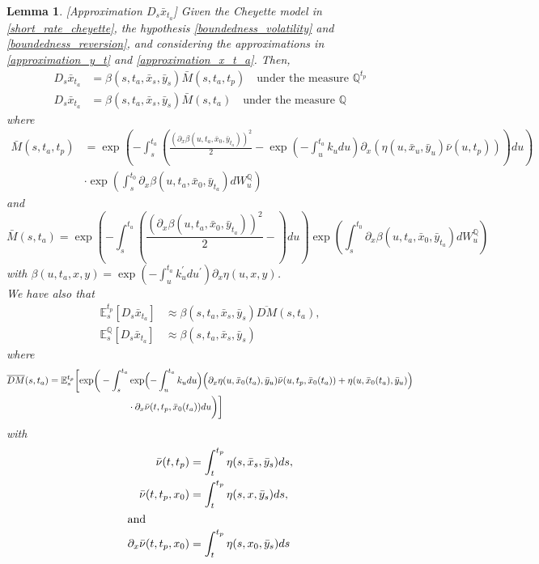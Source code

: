 \documentclass[a4paper,10pt]{article}
\newtheorem{lemma}[theorem]{Lemma}
\newcommand{\1}{\mathbf{1}}
\begin{document}
\begin{lemma}\label{DsX}[Approximation $D_s \bar{x}_{t_a}$]
Given the Cheyette model in \eqref{short_rate_cheyette}, the hypothesis \ref{boundedness_volatility} and \ref{boundedness_reversion}, and considering the approximations in \eqref{approximation_y_t} and \eqref{approximation_x_t_a}. Then, 
\begin{align}\label{approximation_D_s_x_t}
D_s \bar{x}_{t_a} &= \beta(s,t_a,\bar{x}_s,\bar{y}_s) \bar{M}(s,t_a,t_p) \quad \text{under the measure $\mathbb{Q}^{t_p}$} \nonumber \\
D_s \bar{x}_{t_a} &= \beta(s,t_a,\bar{x}_s,\bar{y}_s) \bar{M}(s,t_a)  \quad \text{under the measure $\mathbb{Q}$}
\end{align}
where
\begin{align*}
\bar{M}(s,t_a,t_p) &= \exp\left(-\int_{s}^{t_a} \left( \frac{\left(\partial_x \beta(u,t_a,\bar{x}_0,\bar{y}_{t_a})\right)^{2}}{2} - \exp\left(-\int_{u}^{t_a}k_u du\right) \partial_x (\eta(u, \bar{x}_u, \bar{y}_{u}) \bar{\nu}(u,t_p))\right) du \right) \\ 
&\cdot\exp\left(\int_{s}^{t_0} \partial_x \beta(u,t_a,\bar{x}_0,\bar{y}_{t_a}) dW^{\mathbb{Q}}_u \right)
\end{align*}
and
\begin{equation*}
\bar{M}(s,t_a) = \exp\left(-\int_{s}^{t_a} \left( \frac{\left(\partial_x \beta(u,t_a,\bar{x}_0,\bar{y}_{t_a})\right)^{2}}{2} - \right) du \right) \exp\left(\int_{s}^{t_0} \partial_x \beta(u,t_a,\bar{x}_0,\bar{y}_{t_a}) dW^{\mathbb{Q}}_u \right)
\end{equation*} 
with $\beta(u,t_a,x,y) = \exp\left(-\int_{u}^{t_a}k_u^{\prime} du^{\prime}\right) \partial_x \eta(u,x,y)$.\\

We have also that
\begin{align}\label{approsimation_E_s_x_t}
\mathbb{E}_s^{t_p}\left[D_s \bar{x}_{t_a}\right] &\approx \beta(s,t_a,\bar{x}_s,\bar{y}_s) \overline{DM}(s,t_a), \nonumber \\
\mathbb{E}_s^{\mathbb{Q}}\left[D_s \bar{x}_{t_a}\right]&\approx \beta(s,t_a,\bar{x}_s,\bar{y}_s)
\end{align}
where 
\begin{align*}
\overline{DM}(s,t_a) &= \mathbb{E}^{t_p}_s\biggl[\exp\biggr(-\int_{s}^{t_a} \exp\Bigl(-\int_{u}^{t_a}k_u du\Bigr) \Bigl(\partial_x \eta(u, \bar{x}_0(t_a), \bar{y}_{u}) \bar{\nu}(u,t_p, \bar{x}_0(t_a)) + \eta(u,\bar{x}_0(t_a), \bar{y}_{u})\Bigr) \\
\qquad &\hspace{3cm} \cdot \partial_x \bar{\nu} (t,t_p, \bar{x}_0(t_a)) du\biggr)\biggr]
\end{align*}
with  
\begin{align*}
\bar{\nu}(t,t_p) &= \int_{t}^{t_p} \eta(s,\bar{x}_s,\bar{y}_s) ds, \\
\bar{\nu}(t,t_p, x_0) &= \int_{t}^{t_p} \eta(s,x,\bar{y}_s) ds,\\
\intertext{and}
\partial_x \bar{\nu}(t,t_p,x_0) &= \int_{t}^{t_p} \eta(s,x_0,\bar{y}_s) ds
\end{align*}
\end{lemma}
\end{document}
